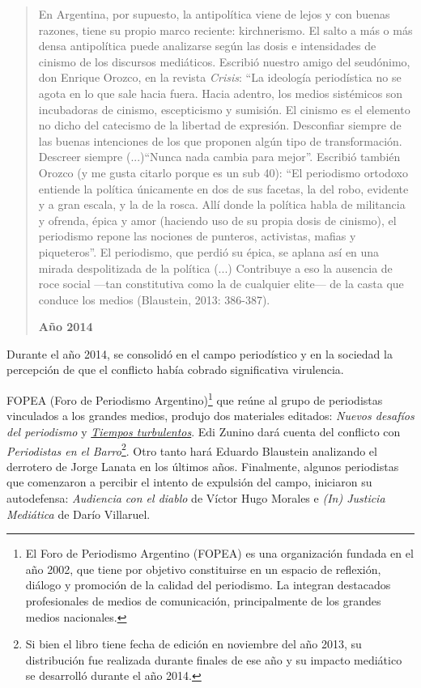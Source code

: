 \begin{quote}
En Argentina, por supuesto, la antipolítica viene de lejos y con buenas razones, tiene su propio marco reciente: kirchnerismo. El salto a más o más densa antipolítica puede analizarse según las dosis e intensidades de cinismo de los discursos mediáticos. Escribió nuestro amigo del seudónimo, don Enrique Orozco, en la revista \emph{Crisis}: ``La ideología periodística no se agota en lo que sale hacia fuera. Hacia adentro, los medios sistémicos son incubadoras de cinismo, escepticismo y sumisión. El cinismo es el elemento no dicho del catecismo de la libertad de expresión. Desconfiar siempre de las buenas intenciones de los que proponen algún tipo de transformación. Descreer siempre (...)``Nunca nada cambia para mejor''. Escribió también Orozco (y me gusta citarlo porque es un sub 40): ``El periodismo ortodoxo entiende la política únicamente en dos de sus facetas, la del robo, evidente y a gran escala, y la de la rosca. Allí donde la política habla de militancia y ofrenda, épica y amor (haciendo uso de su propia dosis de cinismo), el periodismo repone las nociones de punteros, activistas, mafias y piqueteros''. El periodismo, que perdió su épica, se aplana así en una mirada despolitizada de la política (...) Contribuye a eso la ausencia de roce social ---tan constitutiva como la de cualquier elite--- de la casta que conduce los medios (Blaustein, 2013: 386-387).

\textbf{Año 2014}
\end{quote}

Durante el año 2014, se consolidó en el campo periodístico y en la sociedad la percepción de que el conflicto había cobrado significativa virulencia.

FOPEA (Foro de Periodismo Argentino)\footnote{El Foro de Periodismo Argentino (FOPEA) es una organización fundada en el año 2002, que tiene por objetivo constituirse en un espacio de reflexión, diálogo y promoción de la calidad del periodismo. La integran destacados profesionales de medios de comunicación, principalmente de los grandes medios nacionales.} que reúne al grupo de periodistas vinculados a los grandes medios, produjo dos materiales editados: \emph{Nuevos desafíos del periodismo} y \href{http://www.cuspide.com/9789871496990/Tiempos+Turbulentos/}{\emph{Tiempos turbulentos}}. Edi Zunino dará cuenta del conflicto con \emph{Periodistas en el Barro}\footnote{Si bien el libro tiene fecha de edición en noviembre del año 2013, su distribución fue realizada durante finales de ese año y su impacto mediático se desarrolló durante el año 2014.}. Otro tanto hará Eduardo Blaustein analizando el derrotero de Jorge Lanata en los últimos años. Finalmente, algunos periodistas que comenzaron a percibir el intento de expulsión del campo, iniciaron su autodefensa: \emph{Audiencia con el diablo} de Víctor Hugo Morales e \emph{(In) Justicia Mediática} de Darío Villaruel.

